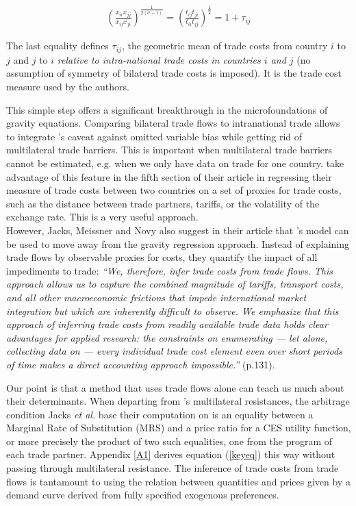 \documentclass{article}
\begin{document}
\begin{eqnarray}
\left( \frac{x_{ii} x_{jj}}{x_{ij} x_{ji}}\right)^{\frac{1}{2(\sigma-1)}} =\left(\frac{t_{ij} t_{ji}}{t_{ii} t_{jj}} \right)^{\frac{1}{2}} = 1+\tau_{ij} \label{keyeq}
\end{eqnarray}

The last equality defines $\tau_{ij}$, the geometric mean
of trade costs from country $i$ to $j$ and $j$ to $i$
\emph{relative to intra-national trade costs in countries $i$
and $j$} (no assumption of symmetry of bilateral trade costs is
imposed). It is the trade cost measure used by the authors.

This simple step offers a significant breakthrough in the
microfoundations of gravity equations. Comparing bilateral
trade flows to intranational trade allows to integrate
\cite{AW2003}'s caveat against omitted variable bias while
getting rid of multilateral trade barriers. This is important
when multilateral trade barriers cannot be estimated, e.g. when
we only have data on trade for one country. \cite{JMN2011} take
advantage of this feature in the fifth section of their article in
regressing their measure of trade costs between two countries
on a set of proxies for trade costs, such as the distance
between trade partners, tariffs, or the volatility of the
exchange rate. This is a very useful approach.\\

However, Jacks, Meissner and Novy also suggest in their article that
\cite{AW2003}'s model can be used to move away from the gravity
regression approach. Instead of explaining trade flows by
observable proxies for costs, they quantify the impact of all
impediments to trade: \emph{``We, therefore, infer trade costs
from trade flows. This approach allows us to capture the
combined magnitude of tariffs, transport costs, and all other
macroeconomic frictions that impede international market
integration but which are inherently difficult to observe. We
emphasize that this approach of inferring trade costs from
readily available trade data holds clear advantages for applied
research: the constraints on enumerating — let alone,
collecting data on — every individual trade cost element
even over short periods of time makes a direct accounting
approach impossible.''} (p.131).

Our point is that a method that uses trade flows
alone can teach us much about their determinants. When
departing from \cite{AW2003}'s multilateral resistances, the
arbitrage condition Jacks \textit{et al.} base their computation on is an
equality between a Marginal Rate of Substitution (MRS) and a
price ratio for a CES utility function, or more precisely the
product of two such equalities, one from the program of each
trade partner. Appendix \ref{A1} derives equation (\ref{keyeq})
this way without passing through multilateral resistance. The
inference of trade costs from trade flows is tantamount to
using the relation between quantities and prices given by a
demand curve derived from fully specified exogenous
preferences.
\end{document}
